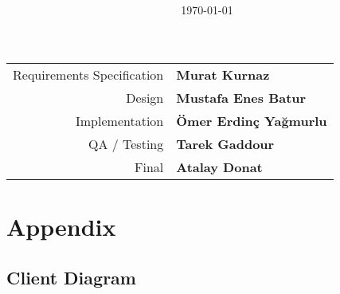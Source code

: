 \documentclass[parskip=full]{scrartcl}
\title{%
    \pseTitle \\
    \large \pseDocTitle
    \date{\today}
}
\begin{document}
\begin{titlepage}
    \maketitle
    \begin{center}
        \begin{tabular}{ r l }
            Requirements Specification & \textbf{Murat Kurnaz}         \\
            Design                     & \textbf{Mustafa Enes Batur}   \\
            Implementation             & \textbf{Ömer Erdinç Yağmurlu} \\
            QA / Testing               & \textbf{Tarek Gaddour}        \\
            Final                      & \textbf{Atalay Donat}         \\
        \end{tabular}
    \end{center}
\end{titlepage}

\tableofcontents


\newpage

\newpage

\newpage

\newpage

\newpage

\newpage

\newpage
% 
% 

\section{Appendix}
\subsection{Client Diagram}


\printnoidxglossary

\end{document}
